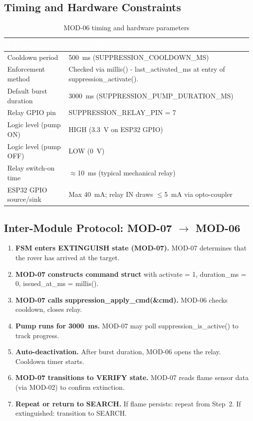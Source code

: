 \documentclass[12pt,a4paper]{article}
\newcommand{\theadtext}[1]{\textcolor{white}{\textbf{#1}}}
\newcommand{\fn}[1]{{\footnotesize\ttfamily #1}}
\begin{document}
\subsection{Timing and Hardware Constraints}

\begin{table}[H]
\centering\small
\begin{tabularx}{\textwidth}{L{5cm} X}
\toprule
{}\theadtext{Parameter} & \theadtext{Value / Notes} \\
\midrule
{}   Cooldown period         & 500~ms (\fn{SUPPRESSION\_COOLDOWN\_MS}) \\
 Enforcement method      & Checked via \fn{millis() - last\_activated\_ms} at entry of \fn{suppression\_activate()}. \\
   Default burst duration  & 3000~ms (\fn{SUPPRESSION\_PUMP\_DURATION\_MS}) \\
 Relay GPIO pin          & \fn{SUPPRESSION\_RELAY\_PIN} = 7 \\
   Logic level (pump ON)   & HIGH (3.3~V on ESP32 GPIO) \\
 Logic level (pump OFF)  & LOW (0~V) \\
   Relay switch-on time    & $\approx$10~ms (typical mechanical relay) \\
 ESP32 GPIO source/sink  & Max 40~mA; relay IN draws $\leq$5~mA via opto-coupler \\
\bottomrule
\end{tabularx}
\caption{MOD-06 timing and hardware parameters}
\end{table}

\subsection{Inter-Module Protocol: MOD-07 $\rightarrow$ MOD-06}

\begin{enumerate}[leftmargin=*, label=\textbf{Step \arabic*.}]
  \item \textbf{FSM enters EXTINGUISH state (MOD-07).} MOD-07 determines that the rover has arrived at the target.
  \item \textbf{MOD-07 constructs command struct} with \fn{activate = 1}, \fn{duration\_ms = 0}, \fn{issued\_at\_ms = millis()}.
  \item \textbf{MOD-07 calls \fn{suppression\_apply\_cmd(\&cmd)}.} MOD-06 checks cooldown, closes relay.
  \item \textbf{Pump runs for 3000~ms.} MOD-07 may poll \fn{suppression\_is\_active()} to track progress.
  \item \textbf{Auto-deactivation.} After burst duration, MOD-06 opens the relay. Cooldown timer starts.
  \item \textbf{MOD-07 transitions to VERIFY state.} MOD-07 reads flame sensor data (via MOD-02) to confirm extinction.
  \item \textbf{Repeat or return to SEARCH.} If flame persists: repeat from Step~2. If extinguished: transition to \fn{SEARCH}.
\end{enumerate}
\end{document}
